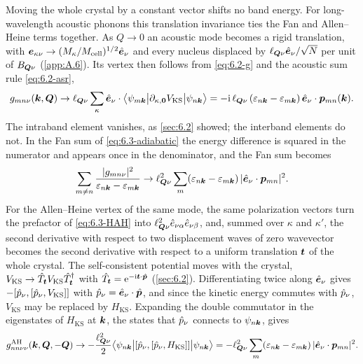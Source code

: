 Moving the whole crystal by a constant vector shifts no band energy. For long-wavelength acoustic phonons this translation invariance ties the Fan and Allen--Heine terms together. As $Q \to 0$ an acoustic mode becomes a rigid translation, with $\bm{e}_{\kappa\nu} \to (M_\kappa/M_{\mathrm{cell}})^{1/2}\hat{\bm{e}}_\nu$ and every nucleus displaced by $\ell_{\bm{Q}\nu}\hat{\bm{e}}_\nu/\sqrt N$ per unit of $B_{\bm{Q}\nu}$ (\cref{app:A.6}). Its vertex then follows from \cref{eq:6.2-g} and the acoustic sum rule \cref{eq:6.2-asr},
\begin{equation*}
  g_{mn\nu}(\bm{k},\bm{Q}) \to \ell_{\bm{Q}\nu}\sum_\kappa\hat{\bm{e}}_\nu\cdot\bigl\langle\psi_{m\bm{k}}\bigr|\partial_{\kappa,\bm{0}}V_{\mathrm{KS}}\bigl|\psi_{n\bm{k}}\bigr\rangle = -\mathrm{i}\,\ell_{\bm{Q}\nu}\,(\varepsilon_{n\bm{k}} - \varepsilon_{m\bm{k}})\,\hat{\bm{e}}_\nu\cdot\bm{p}_{mn}(\bm{k}) .
\end{equation*}
The intraband element vanishes, as \cref{sec:6.2} showed; the interband elements do not. In the Fan sum of \cref{eq:6.3-adiabatic} the energy difference is squared in the numerator and appears once in the denominator, and the Fan sum becomes
\begin{equation*}
  \sum_{m\ne n}\frac{|g_{mn\nu}|^2}{\varepsilon_{n\bm{k}} - \varepsilon_{m\bm{k}}} \to \ell_{\bm{Q}\nu}^2\sum_m(\varepsilon_{n\bm{k}} - \varepsilon_{m\bm{k}})\,|\hat{\bm{e}}_\nu\cdot\bm{p}_{mn}|^2 .
\end{equation*}
For the Allen--Heine vertex of the same mode, the same polarization vectors turn the prefactor of \cref{eq:6.3-HAH} into $\ell_{\bm{Q}\nu}^2\hat e_{\nu\alpha}\hat e_{\nu\beta}$, and, summed over $\kappa$ and $\kappa'$, the second derivative with respect to two displacement waves of zero wavevector becomes the second derivative with respect to a uniform translation $\bm{t}$ of the whole crystal. The self-consistent potential moves with the crystal, $V_{\mathrm{KS}} \to \hat{T}_{\bm{t}}V_{\mathrm{KS}}\hat{T}^\dagger_{\bm{t}}$ with $\hat{T}_{\bm{t}} = \mathrm{e}^{-\mathrm{i}\bm{t}\cdot\hat{\bm{p}}}$ (\cref{sec:6.2}). Differentiating twice along $\hat{\bm{e}}_\nu$ gives $-[\hat{p}_\nu,[\hat{p}_\nu,V_{\mathrm{KS}}]]$ with $\hat{p}_\nu = \hat{\bm{e}}_\nu\cdot\hat{\bm{p}}$, and since the kinetic energy commutes with $\hat{p}_\nu$, $V_{\mathrm{KS}}$ may be replaced by $H_{\mathrm{KS}}$. Expanding the double commutator in the eigenstates of $H_{\mathrm{KS}}$ at $\bm{k}$, the states that $\hat{p}_\nu$ connects to $\psi_{n\bm{k}}$, gives
\begin{equation*}
  g^{\mathrm{AH}}_{nn\nu\nu}(\bm{k},\bm{Q},-\bm{Q}) \to -\frac{\ell_{\bm{Q}\nu}^2}{2}\bigl\langle\psi_{n\bm{k}}\bigr|[\hat{p}_\nu,[\hat{p}_\nu,H_{\mathrm{KS}}]]\bigl|\psi_{n\bm{k}}\bigr\rangle = -\ell_{\bm{Q}\nu}^2\sum_m(\varepsilon_{n\bm{k}} - \varepsilon_{m\bm{k}})\,|\hat{\bm{e}}_\nu\cdot\bm{p}_{mn}|^2 .
\end{equation*}
